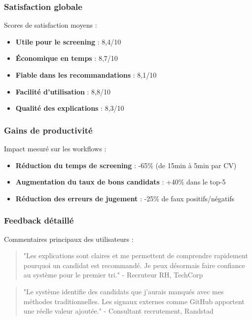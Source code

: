 \documentclass[12pt,a4paper]{report}
\begin{document}
\subsubsection{Satisfaction globale}

Scores de satisfaction moyens :
\begin{itemize}
\item \textbf{Utile pour le screening} : 8,4/10
\item \textbf{Économique en temps} : 8,7/10
\item \textbf{Fiable dans les recommandations} : 8,1/10
\item \textbf{Facilité d'utilisation} : 8,8/10
\item \textbf{Qualité des explications} : 8,3/10
\end{itemize}

\subsubsection{Gains de productivité}

Impact mesuré sur les workflows :
\begin{itemize}
\item \textbf{Réduction du temps de screening} : -65\% (de 15min à 5min par CV)
\item \textbf{Augmentation du taux de bons candidats} : +40\% dans le top-5
\item \textbf{Réduction des erreurs de jugement} : -25\% de faux positifs/négatifs
\end{itemize}

\subsubsection{Feedback détaillé}

Commentaires principaux des utilisateurs :
\begin{quote}
"Les explications sont claires et me permettent de comprendre rapidement pourquoi un candidat est recommandé. Je peux désormais faire confiance au système pour le premier tri." - Recruteur RH, TechCorp
\end{quote}

\begin{quote}
"Le système identifie des candidats que j'aurais manqués avec mes méthodes traditionnelles. Les signaux externes comme GitHub apportent une réelle valeur ajoutée." - Consultant recrutement, Randstad
\end{quote}
\end{document}
